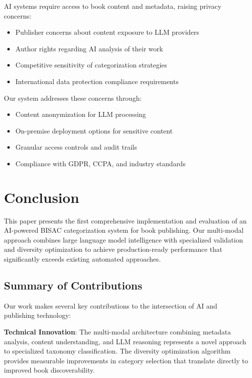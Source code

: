 \documentclass{article}
\begin{document}
AI systems require access to book content and metadata, raising privacy concerns:

\begin{itemize}
\item Publisher concerns about content exposure to LLM providers
\item Author rights regarding AI analysis of their work
\item Competitive sensitivity of categorization strategies
\item International data protection compliance requirements
\end{itemize}

Our system addresses these concerns through:
\begin{itemize}
\item Content anonymization for LLM processing
\item On-premise deployment options for sensitive content
\item Granular access controls and audit trails
\item Compliance with GDPR, CCPA, and industry standards
\end{itemize}

\section{Conclusion}
\label{sec:conclusion}

This paper presents the first comprehensive implementation and evaluation of an AI-powered BISAC categorization system for book publishing. Our multi-modal approach combines large language model intelligence with specialized validation and diversity optimization to achieve production-ready performance that significantly exceeds existing automated approaches.

\subsection{Summary of Contributions}

Our work makes several key contributions to the intersection of AI and publishing technology:

\textbf{Technical Innovation}: The multi-modal architecture combining metadata analysis, content understanding, and LLM reasoning represents a novel approach to specialized taxonomy classification. The diversity optimization algorithm provides measurable improvements in category selection that translate directly to improved book discoverability.
\end{document}
